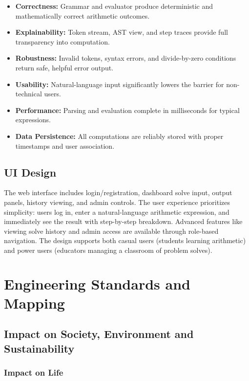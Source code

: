 \documentclass[12pt,a4paper]{report}
\begin{document}
\begin{itemize}
\item \textbf{Correctness:} Grammar and evaluator produce deterministic and mathematically correct arithmetic outcomes.
\item \textbf{Explainability:} Token stream, AST view, and step traces provide full transparency into computation.
\item \textbf{Robustness:} Invalid tokens, syntax errors, and divide-by-zero conditions return safe, helpful error output.
\item \textbf{Usability:} Natural-language input significantly lowers the barrier for non-technical users.
\item \textbf{Performance:} Parsing and evaluation complete in milliseconds for typical expressions.
\item \textbf{Data Persistence:} All computations are reliably stored with proper timestamps and user association.
\end{itemize}

\section{UI Design}

The web interface includes login/registration, dashboard solve input, output panels, history viewing, and admin controls. The user experience prioritizes simplicity: users log in, enter a natural-language arithmetic expression,
and immediately see the result with step-by-step breakdown. Advanced features like viewing solve history and admin access
are available through role-based navigation. The design supports both casual users (students learning arithmetic) and
power users (educators managing a classroom of problem solves).

\chapter{Engineering Standards and Mapping}

\section{Impact on Society, Environment and Sustainability}

\subsection{Impact on Life}
\end{document}
